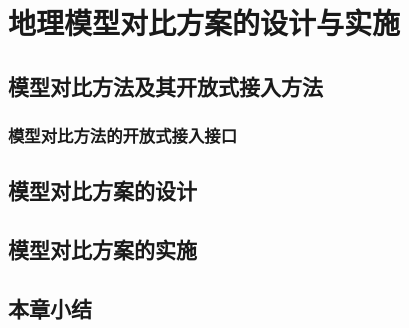 \chapter{地理模型对比方案的设计与实施}

\section{模型对比方法及其开放式接入方法}

\subsection{模型对比方法的开放式接入接口}

\section{模型对比方案的设计}


\section{模型对比方案的实施}

\section{本章小结}
